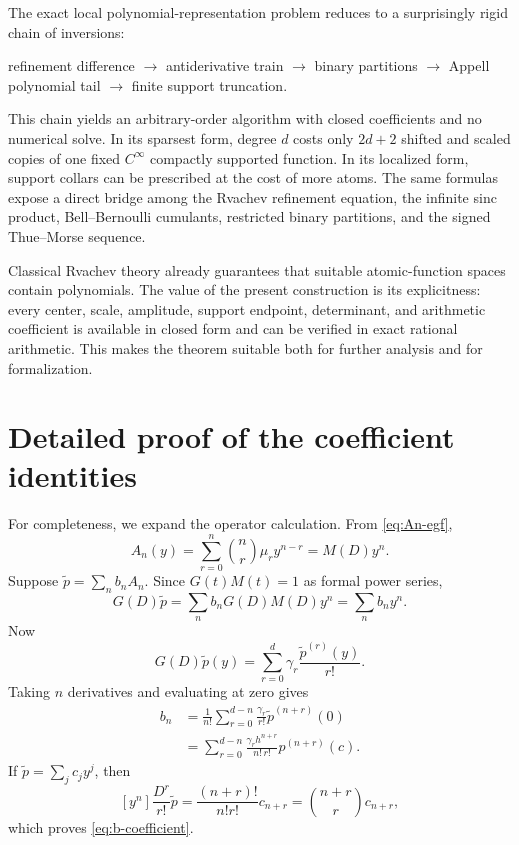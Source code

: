 \documentclass[11pt]{article}
\theoremstyle{definition}
\theoremstyle{remark}
\newcommand{\1}{\mathbf{1}}
\begin{document}
The exact local polynomial-representation problem reduces to a surprisingly
rigid chain of inversions:

\begin{center}
refinement difference
$\longrightarrow$ antiderivative train
$\longrightarrow$ binary partitions
$\longrightarrow$ Appell polynomial tail
$\longrightarrow$ finite support truncation.
\end{center}

This chain yields an arbitrary-order algorithm with closed coefficients and no
numerical solve.  In its sparsest form, degree $d$ costs only $2d+2$ shifted and
scaled copies of one fixed $C^\infty$ compactly supported function.  In its
localized form, support collars can be prescribed at the cost of more atoms.
The same formulas expose a direct bridge among the Rvachev refinement equation,
the infinite sinc product, Bell--Bernoulli cumulants, restricted binary
partitions, and the signed Thue--Morse sequence.

Classical Rvachev theory already guarantees that suitable atomic-function
spaces contain polynomials.  The value of the present construction is its
explicitness: every center, scale, amplitude, support endpoint, determinant,
and arithmetic coefficient is available in closed form and can be verified in
exact rational arithmetic.  This makes the theorem suitable both for further
analysis and for formalization.

\appendix

\section{Detailed proof of the coefficient identities}

For completeness, we expand the operator calculation.  From
\eqref{eq:An-egf},
\[
 A_n(y)=\sum_{r=0}^{n}\binom nr\mu_r y^{n-r}=M(D)y^n.
\]
Suppose $\widetilde p=\sum_nb_nA_n$.  Since $G(t)M(t)=1$ as formal power
series,
\[
 G(D)\widetilde p
 =\sum_nb_nG(D)M(D)y^n
 =\sum_nb_ny^n.
\]
Now
\[
 G(D)\widetilde p(y)
 =\sum_{r=0}^{d}\gamma_r\frac{\widetilde p^{(r)}(y)}{r!}.
\]
Taking $n$ derivatives and evaluating at zero gives
\begin{align*}
 b_n
 &=\frac1{n!}\sum_{r=0}^{d-n}
   \frac{\gamma_r}{r!}\widetilde p^{(n+r)}(0)\\
 &=\sum_{r=0}^{d-n}
   \frac{\gamma_rh^{n+r}}{n!\,r!}p^{(n+r)}(c).
\end{align*}
If $\widetilde p=\sum_jc_jy^j$, then
\[
 [y^n]\frac{D^r}{r!}\widetilde p
 =\frac{(n+r)!}{n!r!}c_{n+r}
 =\binom{n+r}{r}c_{n+r},
\]
which proves \eqref{eq:b-coefficient}.
\end{document}
